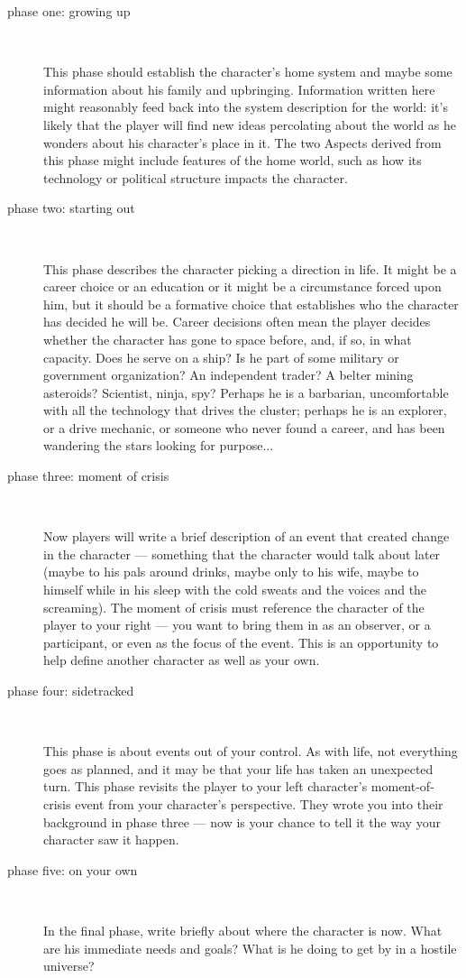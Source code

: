 \begin{description}
\item[phase one: growing up]~

This phase should establish the character's home system and maybe some information about his family and upbringing. Information written here might reasonably feed back into the system description for the world: it's likely that the player will find new ideas percolating about the world as he wonders about his character's place in it. The two Aspects derived from this phase might include features of the home world, such as how its technology or political structure impacts the character.

\item[phase two: starting out]~

This phase describes the character picking a direction in life. It might be a career choice or an education or it might be a circumstance forced upon him, but it should be a formative choice that establishes who the character has decided he will be. Career decisions often mean the player decides whether the character has gone to space before, and, if so, in what capacity. Does he serve on a ship? Is he part of some military or government organization? An independent trader? A belter mining asteroids? Scientist, ninja, spy? Perhaps he is a barbarian, uncomfortable with all the technology that drives the cluster; perhaps he is an explorer, or a drive mechanic, or someone who never found a career, and has been wandering the stars looking for purpose...

\item[phase three: moment of crisis]~

Now players will write a brief description of an event that created change in the character --- something that the character would talk about later (maybe to his pals around drinks, maybe only to his wife, maybe to himself while in his sleep with the cold sweats and the voices and the screaming). The moment of crisis must reference the character of the player to your right --- you want to bring them in as an observer, or a participant, or even as the focus of the event. This is an opportunity to help define another character as well as your own.

\item[phase four: sidetracked]~

This phase is about events out of your control. As with life, not everything goes as planned, and it may be that your life has taken an unexpected turn. This phase revisits the player to your left character's moment-of-crisis event from your character's perspective. They wrote you into their background in phase three --- now is your chance to tell it the way your character saw it happen.

\item[phase five: on your own]~

In the final phase, write briefly about where the character is now. What are his immediate needs and goals? What is he doing to get by in a hostile universe?
\end{description}

